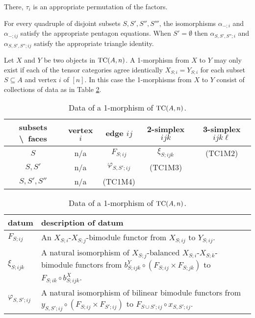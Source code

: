 \documentclass[a4paper]{amsart}
\begin{document}
\begin{list}{(TCO)}{}
\begin{figure}[ht]
\begin{center}
\begin{tikzpicture}[align=left]
		\end{tikzpicture}
	\end{center}
		\label{fig:EqnSSSijObject}
	\end{figure}
	There, $\tau_i$ is an appropriate permutation of the factors. 
	\item  For every quadruple of disjoint subsets $S, S', S'', S'''$, the isomorphisms $\alpha_{-; i}$ and $\alpha_{-; ij}$ satisfy the appropriate pentagon equations. When $S' = \emptyset$ then $\alpha_{S, S', S''; i}$ and $\alpha_{S, S', S''; ij}$ satisfy the appropriate triangle identity.  
\end{list}

Let $X$ and $Y$ be two objects in $\TC(A,n)$. A 1-morphism from $X$ to $Y$ may only exist if each of the tensor categories agree identically $X_{S;i} = Y_{S;i}$ for each subset $S \subseteq A$ and vertex $i$ of $[n]$. 
In this case the 1-morphisms from $X$ to $Y$ consist of collections of data as in Table \ref{Table:1MorOfTC}.
\begin{table}[h]
	\caption{Data of a 1-morphism of $\TC(A,n)$.}
	\begin{tabular}{c |cccc}
	 subsets \textbackslash\ faces & vertex $i$ & edge $ij$ & 2-simplex $ijk$ & 3-simplex $ijk\ell$  \\
	\hline
	$S$ 				& n/a & $F_{S; ij}$ & $\xi_{S; ijk}$  &  (TC1M2) \\
	$S, S'$ 			& n/a & $\varphi_{S, S';ij}$ &  (TC1M3) & \\
	$S, S', S''$ 		& n/a  & (TC1M4) & & \\
	\end{tabular}
	
	\vspace{0.5cm}
	
	\begin{tabular}{l p{11cm}}
		datum & description of datum \\ \hline
		$F_{S;ij}$ & An $X_{S;i}$-$X_{S;j}$-bimodule functor from $X_{S;ij}$ to $Y_{S;ij}$. \\
		$\xi_{S;ijk}$ & A natural isomorphism of $X_{S;j}$-balanced $X_{S;i}$-$X_{S;k}$-bimodule functors from $b^Y_{S;ijk} \circ (F_{S;ij} \times F_{S; jk})$ to $F_{S;ik} \circ b^X_{S;ijk}$. \\
		$\varphi_{S,S'; ij}$ & A natural isomorphism of bilinear bimodule functors from $y_{S,S'; ij} \circ (F_{S; ij} \times F_{S';ij})$ to $F_{S \cup S'; ij} \circ x_{S, S'; ij}$. 
	\end{tabular}
	\label{Table:1MorOfTC}
\end{table}
\end{document}
